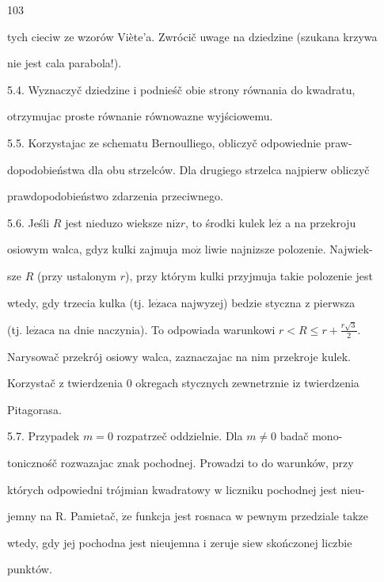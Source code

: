 \documentclass[a4paper,12pt]{article}
\begin{document}
103

tych cieciw ze wzorów Viète'a. Zwrócič uwage na dziedzine (szukana krzywa

nie jest cala parabola!).

5.4. Wyznaczyč dziedzine $\mathrm{i}$ podnieśč obie strony równania do kwadratu,

otrzymujac proste równanie równowazne wyjściowemu.

5.5. Korzystajac ze schematu Bernoulliego, obliczyč odpowiednie praw-

dopodobieństwa dla obu strzelców. Dla drugiego strzelca najpierw obliczyč

prawdopodobieństwo zdarzenia przeciwnego.

5.6. Jeśli $R$ jest nieduzo wieksze $\mathrm{n}\mathrm{i}\dot{\mathrm{z}}r$, to środki kulek $\mathrm{l}\mathrm{e}\dot{\mathrm{z}}$ a na przekroju

osiowym walca, gdyz kulki zajmuja $\mathrm{m}\mathrm{o}\dot{\mathrm{z}}$ liwie najnizsze polozenie. Najwiek-

sze $R$ (przy ustalonym $r$), przy którym kulki przyjmuja takie polozenie jest

wtedy, gdy trzecia kulka (tj. $\mathrm{l}\mathrm{e}\dot{\mathrm{z}}\mathrm{a}\mathrm{c}\mathrm{a}$ najwyzej) bedzie styczna $\mathrm{z}$ pierwsza

(tj. $\mathrm{l}\mathrm{e}\dot{\mathrm{z}}\mathrm{a}\mathrm{c}\mathrm{a}$ na dnie naczynia). To odpowiada warunkowi $r<R\displaystyle \leq r+\frac{r\sqrt{3}}{2}.$

Narysowač przekrój osiowy walca, zaznaczajac na nim przekroje kulek.

Korzystač $\mathrm{z}$ twierdzenia $0$ okregach stycznych zewnetrznie $\mathrm{i}\mathrm{z}$ twierdzenia

Pitagorasa.

5.7. Przypadek $m=0$ rozpatrzeč oddzielnie. Dla $m\neq 0$ badač mono-

tonicznośč rozwazajac znak pochodnej. Prowadzi to do warunków, przy

których odpowiedni trójmian kwadratowy $\mathrm{w}$ liczniku pochodnej jest nieu-

jemny na R. Pamietač, $\dot{\mathrm{z}}\mathrm{e}$ funkcja jest rosnaca $\mathrm{w}$ pewnym przedziale takze

wtedy, gdy jej pochodna jest nieujemna $\mathrm{i}$ zeruje $\mathrm{s}\mathrm{i}\mathrm{e}\mathrm{w}$ skończonej liczbie

punktów.
\end{document}

